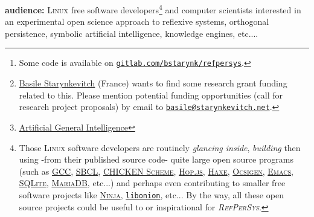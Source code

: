 \documentclass[11pt,a4paper,svgnames]{article}
\newcommand{\RefPerSys}{{\textit{\textsc{RefPerSys}}}}
\begin{document}
\begin{titlepage}
  \thispagestyle{empty}
  \maketitle

  \bigskip

  \begin{abstract}
    \textit{\textsc{RefPerSys}}
    is a \textsc{\textbf{Ref}}lexive and
    orthogonally \textsc{\textbf{Per}}sistent \textsc{\textbf{Sys}}tem
    (as a GPLv3+ licensed free software\footnote{Some code is
    available on
    \href{https://gitlab.com/bstarynk/refpersys}{\texttt{gitlab.com/bstarynk/refpersys}}.})
    running on Linux; it is a
    hobby\footnote{\href{http://starynkevitch.net/Basile/}{Basile
      Starynkevitch} (France) wants to find some research grant
    funding related to this. Please mention potential funding
    opportunities (call for research project proposals) by email to
    \href{mailto:basile@starynkevitch.net}{\texttt{basile@starynkevitch.net}}.} but serious \textbf{research project}
    for many years, mostly aimed to experiment \textbf{open science}
    ideas close to
    \gls{AGI}\footnote{{\href{https://en.wikipedia.org/wiki/Artificial\_general\_intelligence}{Artificial
        General Intelligence}}} dreams, and we don't expect useful or
    interesting results before several years of hard work.
  \end{abstract}

  \medskip

  \textbf{audience:} \textsc{Linux} free software
  developers\footnote{Those \textsc{Linux} software developers are
  routinely \emph{glancing inside}, \emph{building} then using -from
  their published source code- quite large open source programs (such
  as \href{http://gcc.gnu.org/}{\textsc{GCC}},
  \href{http://sbcl.org/}{\textsc{SBCL}},
  \href{https://www.call-cc.org/}{\textsc{CHICKEN Scheme}},
  \href{http://hop.inria.fr/}{\textsc{Hop.js}},
  \href{https://haxe.org/}{\textsc{Haxe}},
  \href{https://ocsigen.org}{\textsc{Ocsigen}},
  \href{https://www.gnu.org/software/emacs/}{\textsc{Emacs}},
  \href{https://sqlite.org/}{\textsc{SQLite}},
  \href{https://mariadb.org/}{\textsc{MariaDB}}, etc...)  and perhaps
  even contributing to smaller free software projects like
  \href{https://ninja-build.org/}{\textsc{Ninja}},
  \href{https://github.com/davidmoreno/onion}{\texttt{libonion}},
  etc... By the way, all these open source projects could be useful to
  or inspirational for \RefPerSys.} and computer scientists interested in
  an experimental open science approach to reflexive systems,
  orthogonal persistence, symbolic artificial intelligence, knowledge
  engines, etc....



\end{titlepage}
\end{document}

